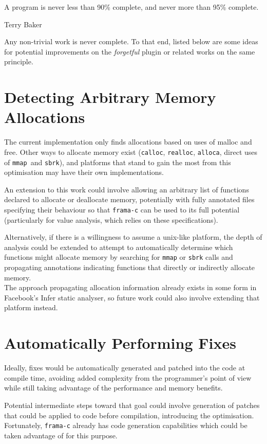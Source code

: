 \epigraph{A program is never less than 90\% complete, and never more than 95\% complete.}{Terry Baker}

Any non-trivial work is never complete. To that end, listed below are some ideas for potential improvements on the \emph{forgetful} plugin or related works on the same principle.

\section{Detecting Arbitrary Memory Allocations}

The current implementation only finds allocations based on uses of malloc and free. Other ways to allocate memory exist (\texttt{calloc}, \texttt{realloc}, \texttt{alloca}, direct uses of \texttt{mmap }and \texttt{sbrk}), and platforms that stand to gain the most from this optimisation may have their own implementations.

An extension to this work could involve allowing an arbitrary list of functions declared to allocate or deallocate memory, potentially with fully annotated files specifying their behaviour so that \texttt{frama-c} can be used to its full potential (particularly for value analysis, which relies on these specifications).

Alternatively, if there is a willingness to assume a unix-like platform, the depth of analysis could be extended to attempt to automatically determine which functions might allocate memory by searching for \texttt{mmap} or \texttt{sbrk} calls and propagating annotations indicating functions that directly or indirectly allocate memory.\\
The approach propagating allocation information already exists in some form in Facebook's Infer \cite{fbinfer} static analyser, so future work could also involve extending that platform instead.

\section{Automatically Performing Fixes}

Ideally, fixes would be automatically generated and patched into the code at compile time, avoiding added complexity from the programmer's point of view while still taking advantage of the performance and memory benefits.

Potential intermediate steps toward that goal could involve generation of patches that could be applied to code before compilation, introducing the optimisation. Fortunately, \texttt{frama-c} already has code generation capabilities which could be taken advantage of for this purpose.
